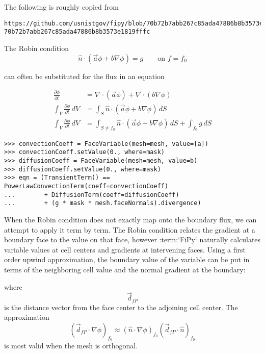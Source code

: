 \documentclass{article}
\begin{document}
The following is roughly copied from
\begin{verbatim}
https://github.com/usnistgov/fipy/blob/70b72b7abb267c85ada47886b8b3573e1819fffc/documentation/USAGE.rst
70b72b7abb267c85ada47886b8b3573e1819fffc
\end{verbatim} 

The Robin condition
\begin{equation*}
\hat{n}\cdot\left(\vec{a}\phi + b\nabla\phi\right) = g\qquad\text{on $f=f_0$}
\end{equation*} 

can often be substituted for the flux in an equation

\begin{equation*}
\begin{aligned}
\frac{\partial\phi}{\partial t}
&= \nabla\cdot\left(\vec{a}\phi\right) + \nabla\cdot\left(b\nabla\phi\right)
\\
\int_V\frac{\partial\phi}{\partial t}\,dV
&= \int_S \hat{n} \cdot \left(\vec{a}\phi + b\nabla\phi\right) \, dS
\\
\int_V\frac{\partial\phi}{\partial t}\,dV
&= \int_{S\neq f_0} \hat{n} \cdot \left(\vec{a}\phi + b\nabla\phi\right) \, dS
+ \int_{f_0} g \, dS
\end{aligned}
\end{equation*} 

\begin{verbatim}
>>> convectionCoeff = FaceVariable(mesh=mesh, value=[a])
>>> convectionCoeff.setValue(0., where=mask)
>>> diffusionCoeff = FaceVariable(mesh=mesh, value=b)
>>> diffusionCoeff.setValue(0., where=mask)
>>> eqn = (TransientTerm() == PowerLawConvectionTerm(coeff=convectionCoeff)
...        + DiffusionTerm(coeff=diffusionCoeff)
...        + (g * mask * mesh.faceNormals).divergence)
\end{verbatim} 

When the Robin condition does not exactly map onto the boundary flux, we can attempt to apply it term by term. The Robin condition relates the gradient at a boundary face to the value on that face, however :term:`FiPy` naturally calculates variable values at cell centers and gradients at intervening faces. Using a first order upwind approximation, the boundary value of the variable can be put in terms of the neighboring cell value and the normal gradient at the boundary:

where
\begin{equation*}
\vec{d}_{fP}
\end{equation*}
is the distance vector from the face center to the adjoining cell center. The approximation 
\begin{equation*}
\left(\vec{d}_{fP}\cdot\nabla\phi\right)_{f_0} \approx \left(\hat{n}\cdot\nabla\phi\right)_{f_0}\left(\vec{d}_{fP}\cdot\hat{n}\right)_{f_0}
\end{equation*} 
is most valid when the mesh is orthogonal.
\end{document}
